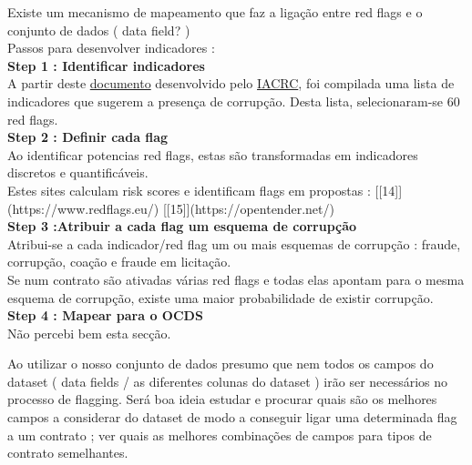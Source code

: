 \documentclass{book}
\begin{document}
Existe um mecanismo de mapeamento que faz a ligação entre red flags e o conjunto de dados ( data field? )\\

Passos para desenvolver indicadores :
\\


\textbf{Step 1 : Identificar indicadores}\\

A partir deste \href{https://guide.iacrc.org/the-red-flags-of-corruption-bid-rigging-collusive-bidding-and-fraud/}{documento} desenvolvido pelo \href{https://iacrc.org/}{IACRC}, foi compilada uma lista de indicadores que sugerem a presença de corrupção. Desta lista, selecionaram-se 60 red flags.\\

\textbf{Step 2 : Definir cada flag}\\

Ao identificar potencias red flags, estas são transformadas em indicadores discretos e quantificáveis.\\

Estes sites calculam risk scores e identificam flags em  propostas : [[14]](https://www.redflags.eu/) [[15]](https://opentender.net/)\\

\textbf{Step 3 :Atribuir a cada flag um esquema de corrupção}\\


Atribui-se a cada indicador/red flag um ou mais esquemas de corrupção : fraude, corrupção, coação e fraude em licitação.\\
 

Se num contrato são ativadas várias red flags e todas elas apontam para o mesma esquema de corrupção, existe uma maior probabilidade de existir corrupção. \\



\textbf{Step 4 : Mapear para o OCDS} \\


Não percebi bem esta secção. 

Ao utilizar o nosso conjunto de dados presumo que nem todos os campos do dataset ( data fields / as diferentes colunas do dataset ) irão ser necessários no processo de flagging. Será boa ideia estudar e procurar quais são os melhores campos a considerar do dataset de modo a conseguir ligar uma determinada flag a um contrato ; ver quais as melhores combinações de campos para tipos de contrato semelhantes.  \\
\end{document}
